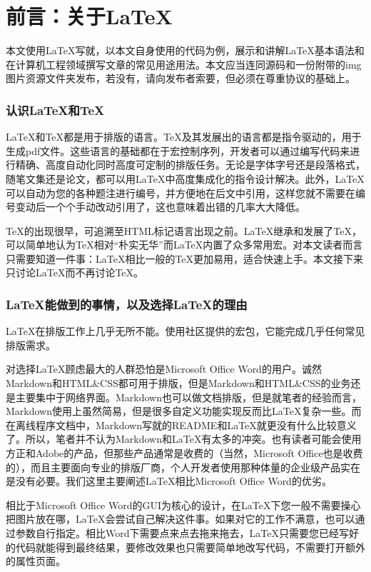 
\part{前言：关于\LaTeX}
本文使用\LaTeX 写就，以本文自身使用的代码为例，展示和讲解\LaTeX 基本语法和在计算机工程领域撰写文章的常见用途用法。本文应当连同源码和一份附带的img图片资源文件夹发布，若没有，请向发布者索要，但必须在尊重协议的基础上。

\section{认识\LaTeX 和\TeX}

\LaTeX 和\TeX 都是用于排版的语言。\TeX 及其发展出的语言都是指令驱动的，用于生成pdf文件。这些语言的基础都在于宏控制序列，开发者可以通过编写代码来进行精确、高度自动化同时高度可定制的排版任务。无论是字体字号还是段落格式，随笔文集还是论文，都可以用\LaTeX 中高度集成化的指令设计解决。此外，\LaTeX 可以自动为您的各种题注进行编号，并方便地在后文中引用，这样您就不需要在编号变动后一个个手动改动引用了，这也意味着出错的几率大大降低。

\TeX 的出现很早，可追溯至HTML标记语言出现之前。\LaTeX 继承和发展了\TeX，可以简单地认为\TeX 相对“朴实无华”而\LaTeX 内置了众多常用宏。对本文读者而言只需要知道一件事：\LaTeX 相比一般的\TeX 更加易用，适合快速上手。本文接下来只讨论\LaTeX 而不再讨论\TeX。

\section{\LaTeX 能做到的事情，以及选择\LaTeX 的理由}

\LaTeX 在排版工作上几乎无所不能。使用社区提供的宏包，它能完成几乎任何常见排版需求。

对选择\LaTeX 顾虑最大的人群恐怕是Microsoft Office Word的用户。诚然Markdown和HTML\&CSS都可用于排版，但是Markdown和HTML\&CSS的业务还是主要集中于网络界面。Markdown也可以做文档排版，但是就笔者的经验而言，Markdown使用上虽然简易，但是很多自定义功能实现反而比\LaTeX 复杂一些。而在离线程序文档中，Markdown写就的README和\LaTeX 就更没有什么比较意义了。所以，笔者并不认为Markdown和\LaTeX 有太多的冲突。也有读者可能会使用方正和Adobe的产品，但那些产品通常是收费的（当然，Microsoft Office也是收费的），而且主要面向专业的排版厂商，个人开发者使用那种体量的企业级产品实在是没有必要。我们这里主要阐述\LaTeX 相比Microsoft Office Word的优劣。

相比于Microsoft Office Word的GUI为核心的设计，在\LaTeX 下您一般不需要操心把图片放在哪，\LaTeX 会尝试自己解决这件事。如果对它的工作不满意，也可以通过参数自行指定。相比Word下需要点来点去拖来拖去，\LaTeX 只需要您已经写好的代码就能得到最终结果，要修改效果也只需要简单地改写代码，不需要打开额外的属性页面。

